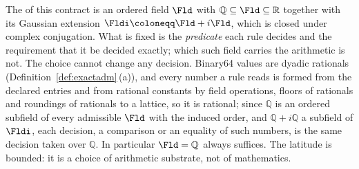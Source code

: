 
\begin{definition}
\label{def:substrate}
The
of this contract is an ordered field $\Fld$ with
$\mathbb{Q}\subseteq\Fld\subseteq\mathbb{R}$ together with its Gaussian
extension $\Fldi\coloneqq\Fld+i\Fld$, which is closed under complex
conjugation. What is fixed is the \emph{predicate} each rule decides and the
requirement that it be decided exactly; which such field carries the
arithmetic is not. The choice cannot change any decision. Binary64 values are
dyadic rationals (Definition~\ref{def:exactadm}\,(a)), and every number a rule
reads is formed from the declared entries and from rational constants by
field operations, floors of rationals and roundings of rationals to a
lattice, so it is rational; since $\mathbb{Q}$ is an ordered subfield of every
admissible $\Fld$ with the induced order, and $\mathbb{Q}+i\mathbb{Q}$ a
subfield of $\Fldi$, each decision, a comparison or an equality of such
numbers, is the same decision taken over $\mathbb{Q}$. In particular
$\Fld=\mathbb{Q}$ always suffices. The latitude is bounded: it is a choice of
arithmetic substrate, not of mathematics.
\end{definition}
